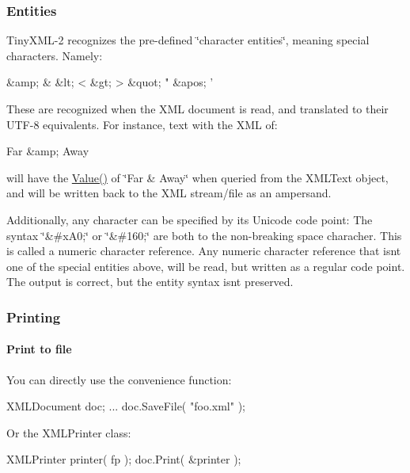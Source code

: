 \subsubsection*{Entities}

Tiny\+X\+M\+L-\/2 recognizes the pre-\/defined \char`\"{}character entities\char`\"{}, meaning special characters. Namely\+: \begin{DoxyVerb}&amp;   &
&lt;    <
&gt;    >
&quot;  "
&apos;  '
\end{DoxyVerb}


These are recognized when the X\+ML document is read, and translated to their U\+T\+F-\/8 equivalents. For instance, text with the X\+ML of\+: \begin{DoxyVerb}Far &amp; Away
\end{DoxyVerb}


will have the \hyperlink{document_8h_a071cf97155ba72ac9a1fc4ad7e63d481}{Value()} of \char`\"{}\+Far \& Away\char`\"{} when queried from the X\+M\+L\+Text object, and will be written back to the X\+ML stream/file as an ampersand.

Additionally, any character can be specified by its Unicode code point\+: The syntax \char`\"{}\&\#x\+A0;\char`\"{} or \char`\"{}\&\#160;\char`\"{} are both to the non-\/breaking space characher. This is called a \textquotesingle{}numeric character reference\textquotesingle{}. Any numeric character reference that isn\textquotesingle{}t one of the special entities above, will be read, but written as a regular code point. The output is correct, but the entity syntax isn\textquotesingle{}t preserved.

\subsubsection*{Printing}

\paragraph*{Print to file}

You can directly use the convenience function\+: \begin{DoxyVerb}XMLDocument doc;
...
doc.SaveFile( "foo.xml" );
\end{DoxyVerb}


Or the X\+M\+L\+Printer class\+: \begin{DoxyVerb}XMLPrinter printer( fp );
doc.Print( &printer );
\end{DoxyVerb}


